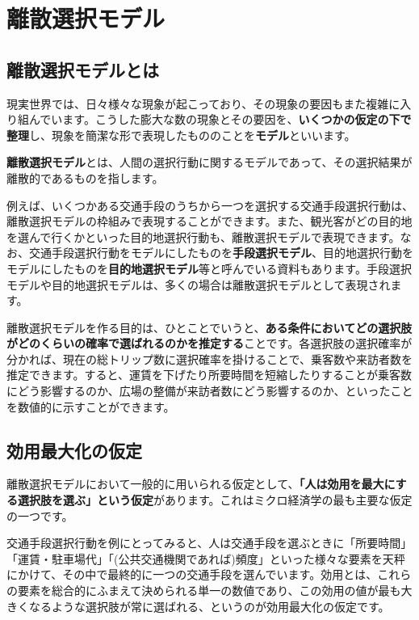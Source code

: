 \chapter{離散選択モデル}\label{ch:model}
\section{離散選択モデルとは}\label{sec:model_intro}

現実世界では、日々様々な現象が起こっており、その現象の要因もまた複雑に入り組んでいます。こうした膨大な数の現象とその要因を、\textbf{いくつかの仮定の下で整理}し、現象を簡潔な形で表現したもののことを\textbf{モデル}といいます。

\textbf{離散選択モデル}とは、人間の選択行動に関するモデルであって、その選択結果が離散的であるものを指します。

例えば、いくつかある交通手段のうちから一つを選択する交通手段選択行動は、離散選択モデルの枠組みで表現することができます。また、観光客がどの目的地を選んで行くかといった目的地選択行動も、離散選択モデルで表現できます。なお、交通手段選択行動をモデルにしたものを\textbf{手段選択モデル}、目的地選択行動をモデルにしたものを\textbf{目的地選択モデル}等と呼んでいる資料もあります。手段選択モデルや目的地選択モデルは、多くの場合は離散選択モデルとして表現されます。

離散選択モデルを作る目的は、ひとことでいうと、\textbf{ある条件においてどの選択肢がどのくらいの確率で選ばれるのかを推定する}ことです。各選択肢の選択確率が分かれば、現在の総トリップ数に選択確率を掛けることで、乗客数や来訪者数を推定できます。すると、運賃を下げたり所要時間を短縮したりすることが乗客数にどう影響するのか、広場の整備が来訪者数にどう影響するのか、といったことを数値的に示すことができます。

\section{効用最大化の仮定}\label{sec:utility_maxim}

離散選択モデルにおいて一般的に用いられる仮定として、\textbf{「人は効用を最大にする選択肢を選ぶ」という仮定}があります。これはミクロ経済学の最も主要な仮定の一つです。

交通手段選択行動を例にとってみると、人は交通手段を選ぶときに「所要時間」「運賃・駐車場代」「(公共交通機関であれば)頻度」といった様々な要素を天秤にかけて、その中で最終的に一つの交通手段を選んでいます。効用とは、これらの要素を総合的にふまえて決められる単一の数値であり、この効用の値が最も大きくなるような選択肢が常に選ばれる、というのが効用最大化の仮定です。

